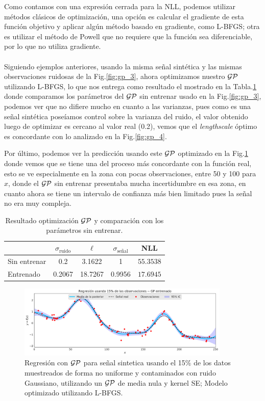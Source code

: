
Como contamos con una expresión cerrada para la NLL, podemos utilizar métodos clásicos de optimización, una opción es calcular el gradiente de esta función objetivo y aplicar algún método basado en gradiente, como L-BFGS; otra es utilizar el método de Powell que no requiere que la función sea diferenciable, por lo que no utiliza gradiente.\\
\\

Siguiendo ejemplos anteriores, usando la misma señal sintética y las mismas observaciones ruidosas de la Fig.\ref{fig:gp_3}, ahora optimizamos nuestro $\mathcal{GP}$ utilizando L-BFGS, lo que nos entrega como resultado el mostrado en la Tabla.\ref{tab:gp_1} donde comparamos los parámetros del $\mathcal{GP}$ sin entrenar usado en la Fig.\ref{fig:gp_3}, podemos ver que no difiere mucho en cuanto a las varianzas, pues como es una señal sintética poseíamos control sobre la varianza del ruido, el valor obtenido luego de optimizar es cercano al valor real (0.2), vemos que el \textit{lengthscale} óptimo es concordante con lo analizado en la Fig.\ref{fig:gp_4}.

Por último, podemos ver la predicción usando este $\mathcal{GP}$ optimizado en la Fig.\ref{fig:gp_5} donde vemos que se tiene una del proceso más concordante con la función real, esto se ve especialmente en la zona con pocas observaciones, entre 50 y 100 para $x$, donde el $\mathcal{GP}$ sin entrenar presentaba mucha incertidumbre en esa zona, en cuanto ahora se tiene un intervalo de confianza más bien limitado pues la señal no era muy compleja.

\begin{table}[H]
\centering
\begin{tabular}{lcccc}
 & $\sigma_{\text{ruido}}$ & $\ell$ & $\sigma_{\text{señal}}$ & NLL\\ \hline
Sin entrenar & 0.2 & 3.1622 & 1 & $\mathbf{55.3538}$\\
Entrenado & 0.2067 & 18.7267 & 0.9956 & $\mathbf{17.6945}$\\
\end{tabular}
\caption{Resultado optimización $\mathcal{GP}$ y comparación con los parámetros sin entrenar.}
\label{tab:gp_1}
\end{table}


\begin{figure}[H]
	\centering
	\includegraphics[width=0.9\textwidth]{img/gp_trained.pdf}
	\caption{Regresión con $\mathcal{GP}$ para señal sintetica usando el 15$\%$ de los datos muestreados de forma no uniforme y contaminados con ruido Gaussiano, utilizando un $\mathcal{GP}$ de media nula y kernel SE; Modelo optimizado utilizando L-BFGS.}
	\label{fig:gp_5}
\end{figure}

